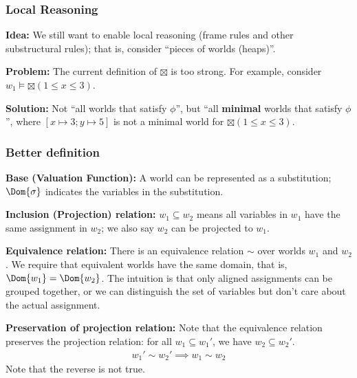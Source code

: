 \begin{frame}[fragile]
    \frametitle{Local Reasoning}

\textbf{Idea:} We still want to enable local reasoning (frame rules and other substructural rules); that is, consider ``pieces of worlds (heaps)''.

\textbf{Problem:} The current definition of $\boxtimes$ is too strong. For example, consider $w_1 \models \boxtimes (1 \leq x \leq 3)$. 

\vspace{0.5cm}

\vspace{0.5cm}
\textbf{Solution:} Not ``all worlds that satisfy $\phi$'', but ``all \textbf{minimal} worlds that satisfy $\phi$'', where $[x\mapsto 3; y \mapsto 5]$ is not a minimal world for $\boxtimes (1 \leq x \leq 3)$. 

\end{frame}

\begin{frame}[fragile]
    \frametitle{Better definition}

\textbf{Base (Valuation Function):} A world can be represented as a substitution; $\Dom{\sigma}$ indicates the variables in the substitution.

\textbf{Inclusion (Projection) relation:} $w_1 \subseteq w_2$ means all variables in $w_1$ have the same assignment in $w_2$; we also say $w_2$ can be projected to $w_1$.

\textbf{Equivalence relation:} There is an equivalence relation $\sim$ over worlds $w_1$ and $w_2$. We require that equivalent worlds have the same domain, that is, $\Dom{w_1} = \Dom{w_2}$. The intuition is that only aligned assignments can be grouped together, or we can distinguish the set of variables but don't care about the actual assignment.

\textbf{Preservation of projection relation:} Note that the equivalence relation preserves the projection relation: for all $w_1 \subseteq w_1'$, we have $w_2 \subseteq w_2'$.
\begin{align*}
    w_1' \sim w_2' \implies w_1 \sim w_2
\end{align*}
\noindent Note that the reverse is not true.


\end{frame}


